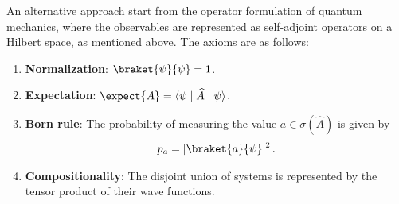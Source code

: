 
    An alternative approach start from the operator formulation of quantum mechanics, where the observables are represented as self-adjoint operators on a Hilbert space, as mentioned above. The axioms are as follows:
    \begin{enumerate}
        \item\textbf{Normalization}: $\braket{\psi}{\psi} = 1$.
        \item\textbf{Expectation}: $\expect{A} = \langle\psi\mid\widehat{A}\mid\psi\rangle$.
        \item\textbf{Born rule}: The probability of measuring the value $a\in\sigma(\widehat{A})$ is given by
        \begin{gather}
            p_a = |\braket{a}{\psi}|^2\,.
        \end{gather}
        \item\textbf{Compositionality}: The disjoint union of systems is represented by the tensor product of their wave functions.
    \end{enumerate}

